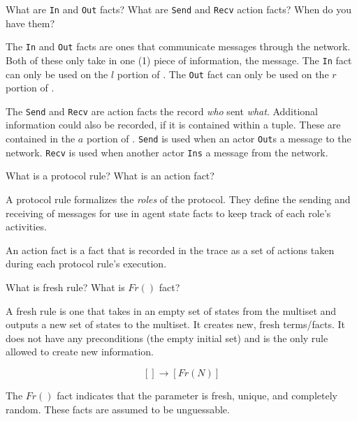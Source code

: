 \begin{questions}
\question{} What are \texttt{In} and \texttt{Out} facts? What are \texttt{Send} and \texttt{Recv} action facts? When do you have them?
  \begin{solution}
    The \texttt{In} and \texttt{Out} facts are ones that communicate messages through the network.
    Both of these only take in one (1) piece of information, the message.
    The \texttt{In} fact can only be used on the $l$ portion of .
    The \texttt{Out} fact can only be used on the $r$ portion of .

    The \texttt{Send} and \texttt{Recv} are action facts the record \emph{who} sent \emph{what}.
    Additional information could also be recorded, if it is contained within a tuple.
    These are contained in the $a$ portion of .
    \texttt{Send} is used when an actor \texttt{Out}s a message to the network.
    \texttt{Recv} is used when another actor \texttt{Ins} a message from the network.
  \end{solution}

\question{} What is a protocol rule? What is an action fact?
  \begin{solution}
    A protocol rule formalizes the \emph{roles} of the protocol.
    They define the sending and receiving of messages for use in agent state facts to keep track of each role's activities.

    An action fact is a fact that is recorded in the trace as a set of actions taken during each protocol rule's execution.
  \end{solution}

\question{} What is fresh rule? What is $Fr()$ fact?
  \begin{solution}
    A fresh rule is one that takes in an empty set of states from the multiset and outputs a new set of states to the multiset.
    It creates new, fresh terms/facts.
    It does not have any preconditions (the empty initial set) and is the only rule allowed to create new information.

    \begin{equation}\label{eq:Fresh_Rule}
      [] \rightarrow [Fr(N)]
    \end{equation}

    The $Fr()$ fact indicates that the parameter is fresh, unique, and completely random.
    These facts are assumed to be unguessable.
  \end{solution}


\end{questions}
